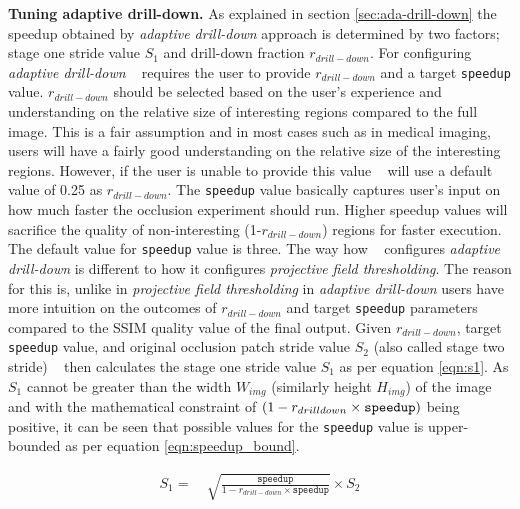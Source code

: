 \vspace{2mm}
\noindent \textbf{Tuning adaptive drill-down.}
As explained in section \ref{sec:ada-drill-down} the speedup obtained by \textit{adaptive drill-down} approach is determined by two factors; stage one stride value $S_1$ and drill-down fraction $r_{drill-down}$.
For configuring \textit{adaptive drill-down} \system~ requires the user to provide $r_{drill-down}$ and a target \texttt{speedup} value.
$r_{drill-down}$ should be selected based on the user's experience and understanding on the relative size of interesting regions compared to the full image.
This is a fair assumption and in most cases such as in medical imaging, users will have a fairly good understanding on the relative size of the interesting regions.
However, if the user is unable to provide this value \system~ will use a default value of 0.25 as $r_{drill-down}$.
The \texttt{speedup} value basically captures user's input on how much faster the occlusion experiment should run.
Higher speedup values will sacrifice the quality of non-interesting (1-$r_{drill-down}$) regions for faster execution.
The default value for \texttt{speedup} value is three.
The way how \system~ configures \textit{adaptive drill-down} is different to how it configures \textit{projective field thresholding}.
The reason for this is, unlike in \textit{projective field thresholding} in \textit{adaptive drill-down} users have more intuition on the outcomes of $r_{drill-down}$ and target \texttt{speedup} parameters compared to the SSIM quality value of the final output.
Given $r_{drill-down}$, target \texttt{speedup} value, and original occlusion patch stride value $S_2$ (also called stage two stride) \system~ then calculates the stage one stride value $S_1$ as per equation \ref{eqn:s1}.
As $S_1$ cannot be greater than the width $W_{img}$ (similarly height $H_{img}$) of the image and with the mathematical constraint of $(1-r_{drill\-down} \times \texttt{speedup})$ being positive, it can be seen that possible values for the \texttt{speedup} value is upper-bounded as per equation \ref{eqn:speedup_bound}.

\begin{align}
\label{eqn:s1}
S_1 = &~ \sqrt{\frac{\texttt{speedup}}{1 - r_{drill-down} \times \texttt{speedup}}} \times S_2
\end{align}

